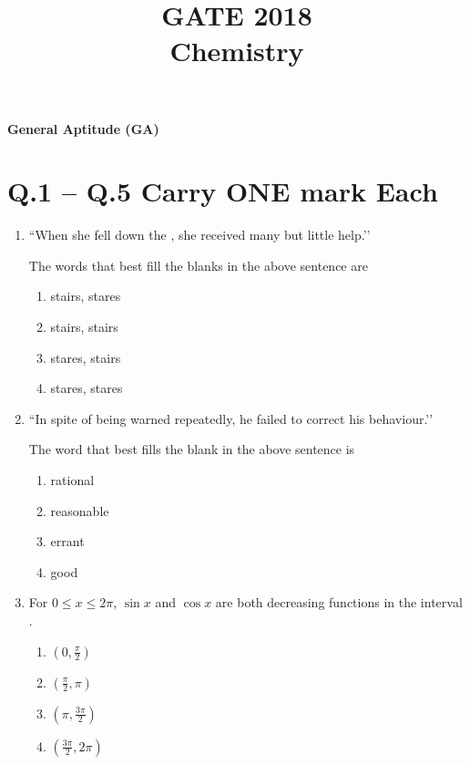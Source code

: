 \documentclass{article}
\title{\textbf{GATE 2018\\Chemistry}}
\date{}
\begin{document}
\maketitle
\noindent \textbf{General Aptitude (GA)}

\section*{Q.1 – Q.5 Carry ONE mark Each}
\begin{enumerate}
\item ``When she fell down the \underline{\hspace{1.5cm}}, she received many \underline{\hspace{1.5cm}} but little help.’’

The words that best fill the blanks in the above sentence are  
\begin{multicols}{2}
\begin{enumerate}
\item stairs, stares
\item stairs, stairs
\item stares, stairs
\item stares, stares
\end{enumerate}
\end{multicols}

\item ``In spite of being warned repeatedly, he failed to correct his \underline{\hspace{2cm}} behaviour.’’

The word that best fills the blank in the above sentence is  
\begin{multicols}{4}
\begin{enumerate}
\item rational
\item reasonable
\item errant
\item good
\end{enumerate}
\end{multicols}

\item For $0 \leq x \leq 2\pi$, $\sin x$ and $\cos x$ are both decreasing functions in the interval \underline{\hspace{2cm}}.  

\begin{multicols}{4}
\begin{enumerate}
\item $(0,\tfrac{\pi}{2})$
\item $(\tfrac{\pi}{2}, \pi)$
\item $(\pi,\tfrac{3\pi}{2})$
\item $(\tfrac{3\pi}{2},2\pi)$
\end{enumerate}
\end{multicols}


\end{enumerate}
\end{document}
